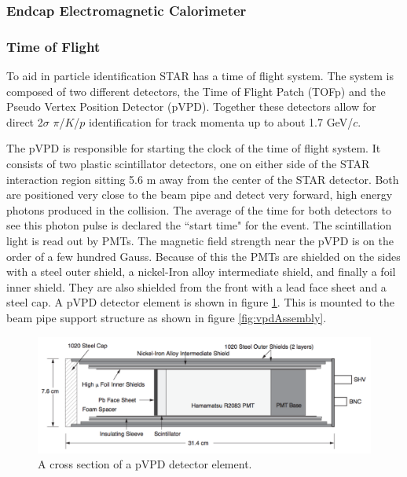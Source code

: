 \documentclass[abstract = on,listof=totoc, bibliography=totoc]{scrreprt}
\begin{document}
\FloatBarrier
\subsubsection[EEMC]{Endcap Electromagnetic Calorimeter}

\subsubsection[TOF]{Time of Flight}

To aid in particle identification STAR has a time of flight system. The system is composed of two different detectors, the Time of Flight Patch (TOFp) and the Pseudo Vertex Position Detector (pVPD).  Together these detectors allow for direct 2$\sigma$ $\pi$/$K$/$p$ identification for track momenta up to about 1.7 GeV/$c$.

The pVPD is responsible for starting the clock of the time of flight system. It consists of two plastic scintillator detectors, one on either side of the STAR interaction region sitting 5.6 m away from the center of the STAR detector. Both are positioned very close to the beam pipe and detect very forward, high energy photons produced in the collision. The average of the time for both detectors to see this photon pulse is declared the ``start time" for the event. The scintillation light is read out by PMTs. The magnetic field strength near the pVPD is on the order of a few hundred Gauss. Because of this the PMTs are shielded on the sides with a steel outer shield, a nickel-Iron alloy intermediate shield, and finally a foil inner shield. They are also shielded from the front with a lead face sheet and a steel cap. A pVPD detector element is shown in figure \ref{fig:vpdDetector}. This is mounted to the beam pipe support structure as shown in figure \ref{fig:vpdAssembly}.    

\begin{figure}
\begin{center}
\includegraphics[width = .8\textwidth]{vpdDetector}
\caption[pVPD detector element]{A cross section of a pVPD detector element.}
\label{fig:vpdDetector}
\end{center}
\end{figure}
\end{document}
